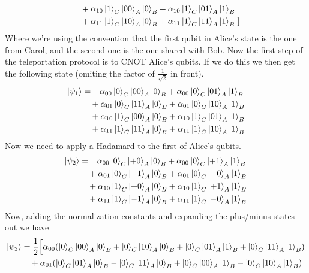 \documentclass[boxes,pages]{homework}
\begin{document}
\begin{solution}
\begin{align*}
		                                                             & \quad + \alpha_{10}\ket{1}_C\ket{00}_A\ket{0}_B + \alpha_{10}\ket{1}_C\ket{01}_A\ket{1}_B               \\
		                                                             & \quad + \alpha_{11}\ket{1}_C\ket{10}_A\ket{0}_B + \alpha_{11}\ket{1}_C\ket{11}_A\ket{1}_B \left.\right]
	\end{align*}
	Where we're using the convention that the first qubit in Alice's state is the one from Carol, and the second one is the one shared with Bob. Now the first step of the teleportation protocol is to \textsc{CNOT} Alice's qubits. If we do this we then get the following state (omiting the factor of $\tfrac{1}{\sqrt{2}}$ in front).
	\begin{align*}
		\ket{\psi_1} & = \phantom{+}\alpha_{00}\ket{0}_C\ket{00}_A\ket{0}_B + \alpha_{00}\ket{0}_C\ket{01}_A\ket{1}_B \\
		             & \quad + \alpha_{01}\ket{0}_C\ket{11}_A\ket{0}_B + \alpha_{01}\ket{0}_C\ket{10}_A\ket{1}_B      \\
		             & \quad + \alpha_{10}\ket{1}_C\ket{00}_A\ket{0}_B + \alpha_{10}\ket{1}_C\ket{01}_A\ket{1}_B      \\
		             & \quad + \alpha_{11}\ket{1}_C\ket{11}_A\ket{0}_B + \alpha_{11}\ket{1}_C\ket{10}_A\ket{1}_B
	\end{align*}
	Now we need to apply a Hadamard to the first of Alice's qubits.
	\begin{align*}
		\ket{\psi_2} & = \phantom{+}\alpha_{00}\ket{0}_C\ket{+0}_A\ket{0}_B + \alpha_{00}\ket{0}_C\ket{+1}_A\ket{1}_B \\
		             & \quad + \alpha_{01}\ket{0}_C\ket{-1}_A\ket{0}_B + \alpha_{01}\ket{0}_C\ket{-0}_A\ket{1}_B      \\
		             & \quad + \alpha_{10}\ket{1}_C\ket{+0}_A\ket{0}_B + \alpha_{10}\ket{1}_C\ket{+1}_A\ket{1}_B      \\
		             & \quad + \alpha_{11}\ket{1}_C\ket{-1}_A\ket{0}_B + \alpha_{11}\ket{1}_C\ket{-0}_A\ket{1}_B
	\end{align*}
	Now, adding the normalization constants and expanding the plus/minus states out we have
	\begin{align*}
		\ket{\psi_2} & = \frac{1}{2}\Big[\alpha_{00}\qty(\ket{0}_C\ket{00}_A\ket{0}_B + \ket{0}_C\ket{10}_A\ket{0}_B + \ket{0}_C\ket{01}_A\ket{1}_B + \ket{0}_C\ket{11}_A\ket{1}_B) \\
		             & \quad + \alpha_{01}\qty(\ket{0}_C\ket{01}_A\ket{0}_B - \ket{0}_C\ket{11}_A\ket{0}_B + \ket{0}_C\ket{00}_A\ket{1}_B - \ket{0}_C\ket{10}_A\ket{1}_B)           \\

\end{align*}
\end{solution}
\end{document}
